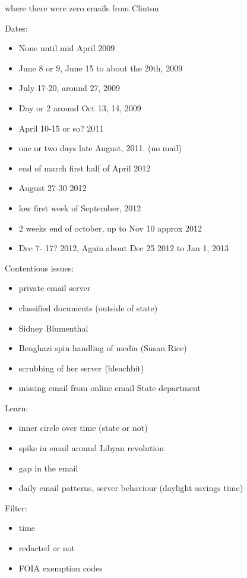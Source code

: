 \documentclass[journal]{vgtc}                %
\begin{document}
where there were zero emails from Clinton


Dates:
\begin{itemize}
\item None until mid April 2009
\item June 8 or 9, June 15 to about the 20th, 2009
\item July 17-20,  around 27, 2009 
\item Day or 2 around Oct 13, 14, 2009
\item April 10-15 or so? 2011
\item one or two days late August, 2011. (no mail)
\item end of march first half of April 2012
\item August 27-30  2012 
\item low first week of September, 2012
\item 2 weeks end of october, up to Nov 10 approx 2012
\item Dec 7- 17? 2012,  Again about Dec 25 2012 to Jan 1, 2013
\end{itemize}

Contentious issues:
\begin{itemize}
\item private email server
\item classified documents (outside of state)
\item Sidney Blumenthal
\item Benghazi spin handling of media (Susan Rice)

\item scrubbing of her server (bleachbit)
\item missing email from online email State department
\end{itemize}


Learn:
\begin{itemize}
\item inner circle over time (state or not)
\item spike in email around Libyan revolution
\item gap in the email
\item daily email patterns, server behaviour (daylight savings time)
\end{itemize}

  
 Filter:
\begin{itemize}
\item time
\item redacted or not
\item FOIA exemption codes
\end{itemize}
\end{document}
